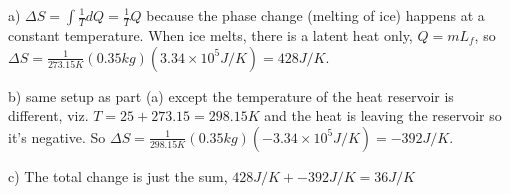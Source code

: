 \documentclass[10pt]{article}
\newenvironment{problem}[2][Problem]{\begin{trivlist}
\item[\hskip \labelsep {\bfseries #1}\hskip \labelsep {\bfseries #2.}]}{\end{trivlist}}
\begin{document}
\begin{problem}{5}
\item a) $\Delta S = \int \frac{1}{T} dQ=\frac{1}{T} Q$ because the phase change (melting of ice) happens at a constant temperature. When ice melts, there is a latent heat only, $Q=mL_f$, so $\Delta S=\frac{1}{273.15K} (0.35kg)(3.34\times 10^5 J/K)=428J/K.$
\item b) same setup as part (a) except the temperature of the heat reservoir is different, viz. $T = 25+273.15=298.15K$ and the heat is leaving the reservoir so it's negative. So $\Delta S=\frac{1}{298.15K} (0.35kg)(-3.34\times 10^5 J/K)=-392J/K.$
\item c) The total change is just the sum, $428J/K + -392J/K=36J/K$



\end{problem}




\end{document}
